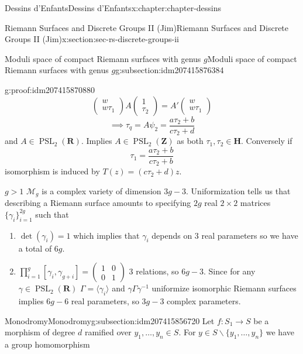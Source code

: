 \documentclass[oneside,10pt,]{book}
\numberwithin{equation}{section}
\newcommand{\inv}{^{-1}}
\newcommand{\lb}{[}
\newcommand{\rb}{]}
\newcommand{\ZZ}{\mathbf{Z}}
\newcommand{\RR}{\mathbf{R}}
\newcommand{\HH}{\mathbf{H}}
\DeclareMathOperator{\PSL}{PSL}
\newcommand{\gt}{>}
\newcommand{\amp}{&}
\begin{document}
\begin{chapterptx}{Dessins d'Enfants}{}{Dessins d'Enfants}{}{}{x:chapter:chapter-dessins}
\begin{sectionptx}{Riemann Surfaces and Discrete Groups II (Jim)}{}{Riemann Surfaces and Discrete Groups II (Jim)}{}{}{x:section:sec-rs-discrete-groups-ii}
\begin{subsectionptx}{Moduli space of compact Riemann surfaces with genus \(g\)}{}{Moduli space of compact Riemann surfaces with genus \(g\)}{}{}{g:subsection:idm207415876384}
\begin{proofptx}{}{g:proof:idm207415870880}
\begin{equation*}
\begin{pmatrix} w\\ w\tau_1 \end{pmatrix} A \begin{pmatrix}1\\ \tau_2\end{pmatrix} = A' \begin{pmatrix} w \\ w\tau_1 \end{pmatrix}
\end{equation*}
%
\begin{equation*}
\implies \tau_q = A \psi_2 = \frac{a\tau_2 + b}{c\tau_2 + d}
\end{equation*}
and \(A \in \PSL_2(\RR)\). Implies \(A\in \PSL_2(\ZZ)\) as both \(\tau_1,\tau_2 \in \HH\). Conversely if%
\begin{equation*}
\tau_1 = \frac{a\tau_2 + b}{c\tau_2 + b}
\end{equation*}
isomorphism is induced by \(T(z) = (c\tau_2 + d) z\).%
\end{proofptx}
\(g \gt 1\) \(\mathcal M_g\) is a complex variety of dimension \(3g-3\). Uniformization tells us that describing a Riemann surface amounts to specifying \(2g\) real \(2\times 2\) matrices \(\{\gamma_i\}_{i=1}^{2g}\) such that%
\begin{enumerate}
\item{}\(\det(\gamma_i) = 1\) which implies that \(\gamma_i\) depends on 3 real parameters so we have a total of \(6g\).%
\item{}\(\prod_{i=1}^g \lb \gamma_i, \gamma_{g+i}\rb = \begin{pmatrix} 1\amp 0 \\ 0\amp 1\end{pmatrix}\) 3 relations, so \(6g- 3\). Since for any \(\gamma \in \PSL_2(\RR)\) \(\Gamma = \langle \gamma_i \rangle\) and \(\gamma\Gamma \gamma\inv\) uniformize isomorphic Riemann surfaces implies \(6g-6\) real parameters, so \(3g-3\) complex parameters.%
\end{enumerate}
%
\end{subsectionptx}
%
%
\typeout{************************************************}
\typeout{************************************************}
%
\begin{subsectionptx}{Monodromy}{}{Monodromy}{}{}{g:subsection:idm207415856720}
Let \(f\colon S_1 \to S\) be a morphism of degree \(d\) ramified over \(y_1,\ldots, y_n \in S\). For \(y\in S\smallsetminus \{y_1,\ldots, y_n\}\) we have a group homomorphism%

\end{subsectionptx}
\end{sectionptx}
\end{chapterptx}
\end{document}
